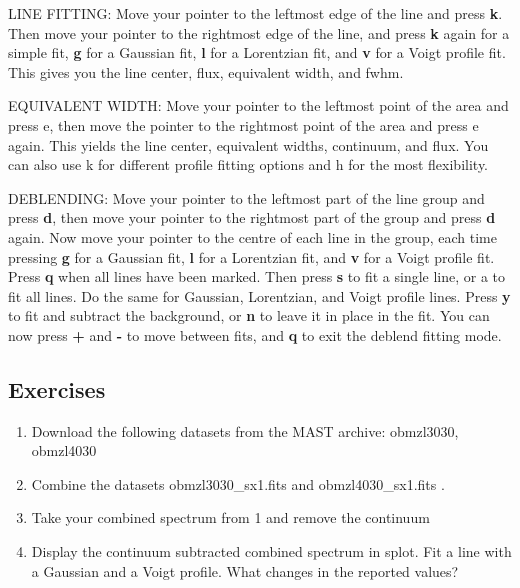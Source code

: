 LINE FITTING: Move your pointer to the leftmost edge of the line and press {\bf k}. Then move your pointer to the rightmost edge of the line, and press {\bf k} again for a simple fit, {\bf g} for a Gaussian fit, {\bf l} for a Lorentzian fit, and {\bf v} for a Voigt profile fit. This gives you the line center, flux, equivalent width, and fwhm.

EQUIVALENT WIDTH: Move your pointer to the leftmost point of the area and press e, then move the pointer to the rightmost point of the area and press e again. This yields the line center, equivalent widths, continuum, and flux. You can also use k for different profile fitting options and h for the most flexibility.

DEBLENDING: Move your pointer to the leftmost part of the line group and press {\bf d}, then move your pointer to the rightmost part of the group and press {\bf d} again. Now move your pointer to the centre of each line in the group, each time pressing {\bf g} for a Gaussian fit, {\bf l} for a Lorentzian fit, and {\bf v} for a Voigt profile fit. Press {\bf q} when all lines have been marked. Then press {\bf s} to fit a single line, or a to fit all lines. Do the same for Gaussian, Lorentzian, and Voigt profile lines. Press {\bf y} to fit and subtract the background, or {\bf n} to leave it in place in the fit. You can now press {\bf +} and {\bf -} to move between fits, and {\bf q} to exit the deblend fitting mode.


\subsection{Exercises}
\begin{enumerate}

\item Download the following datasets from the MAST archive: obmzl3030, obmzl4030
\item Combine the datasets obmzl3030\_sx1.fits and obmzl4030\_sx1.fits .
\item Take your combined spectrum from 1 and remove the continuum
\item Display the continuum subtracted combined spectrum in splot. Fit a line with a Gaussian and a Voigt profile. What changes in the reported values?
\end{enumerate}
